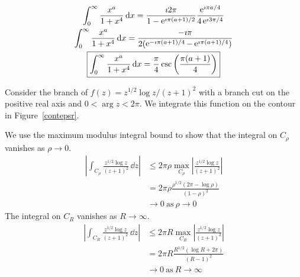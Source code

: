 {\begin{Solution}
\begin{gather*}
    \int_0^\infty \frac{x^a}{1 + x^4} \,\mathrm{d} x
    = \frac{\imath 2 \pi}{ 1 - \mathop{\mathrm{e}}\nolimits^{\imath \pi (a+1) / 2} }  \frac{ \mathop{\mathrm{e}}\nolimits^{\imath \pi a / 4} }{ 4 \mathop{\mathrm{e}}\nolimits^{\imath 3 \pi / 4} } \\
    \int_0^\infty \frac{x^a}{1 + x^4} \,\mathrm{d} x
    = \frac{ - \imath \pi }{ 2( \mathop{\mathrm{e}}\nolimits^{ -\imath \pi (a+1) / 4} - \mathop{\mathrm{e}}\nolimits^{ \imath \pi (a+1)/4} ) } \\
    \boxed{
      \int_0^\infty \frac{x^a}{1 + x^4} \,\mathrm{d} x
      = \frac{\pi}{4} \csc \left( \frac{ \pi(a+1) }{ 4 } \right)
      }
  \end{gather*}
\end{Solution}


















\begin{Solution}
  \label{solution x^(1/2) log x / (x+1)^2}
  Consider the branch of $f(z) = z^{1/2} \log z / (z+1)^2$ with a 
  branch cut on the positive real axis and $0 < \arg z < 2 \pi$.  We integrate
  this function on the contour in Figure~\ref{contepsr}.

  We use the maximum modulus integral bound to show that the integral on 
  $C_\rho$ vanishes as $\rho \to 0$.
  \begin{align*}
    \left| \int_{C_\rho} \frac{ z^{1/2} \log z }{ (z+1)^2 } \,\dd z \right|
    &\leq 2 \pi \rho \max_{C_\rho} \left| 
      \frac{ z^{1/2} \log z }{ (z+1)^2 } \right| \\
    &= 2 \pi \rho \frac{\rho^{1/2} (2 \pi - \log \rho ) }
    { (1 - \rho)^2 } \\
    &\to 0\ \mathrm{as}\ \rho \to 0
  \end{align*}
  The integral on $C_R$ vanishes as $R \to \infty$.
  \begin{align*}
    \left| \int_{C_R} \frac{z^{1/2} \log z }{ (z+1)^2 } \,\dd z \right|
    &\leq 2 \pi R \max_{C_R} \left| 
      \frac{ z^{1/2} \log z }{ (z+1)^2 } \right| \\
    &= 2 \pi R \frac{ R^{1/2} (\log R + 2 \pi) }
    { (R-1)^2 } \\
    &\to 0\ \mathrm{as}\ R \to \infty
  \end{align*}


\end{Solution}}
